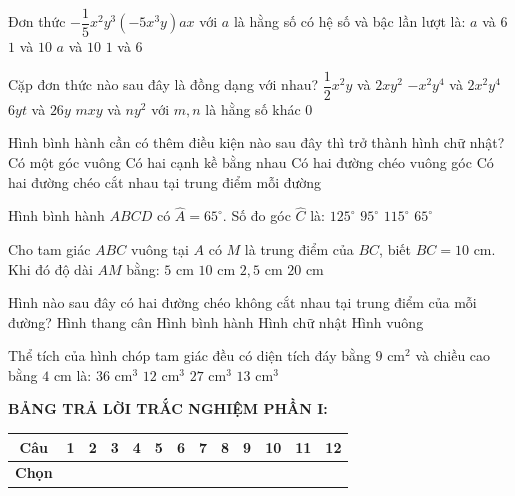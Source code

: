 \documentclass[12pt,a4paper]{article}
\begin{document}
\begin{ex}
Đơn thức $-\dfrac{1}{5}x^2y^3(-5x^3y)ax$ với $a$ là hằng số có hệ số và bậc lần lượt là:
\choice
{$a$ và $6$}
{$1$ và $10$}
{\True $a$ và $10$}
{$1$ và $6$}
\end{ex}

\begin{ex}
Cặp đơn thức nào sau đây là đồng dạng với nhau?
\choice
{$\dfrac{1}{2}x^2y$ và $2xy^2$}
{\True $-x^2y^4$ và $2x^2y^4$}
{$6yt$ và $26y$}
{$mxy$ và $ny^2$ với $m, n$ là hằng số khác $0$}
\end{ex}

\begin{ex}
Hình bình hành cần có thêm điều kiện nào sau đây thì trở thành hình chữ nhật?
\choice
{\True Có một góc vuông}
{Có hai cạnh kề bằng nhau}
{Có hai đường chéo vuông góc}
{Có hai đường chéo cắt nhau tại trung điểm mỗi đường}
\end{ex}

\begin{ex}
Hình bình hành $ABCD$ có $\widehat{A} = 65^\circ$. Số đo góc $\widehat{C}$ là:
\choice
{$125^\circ$}
{$95^\circ$}
{$115^\circ$}
{\True $65^\circ$}
\end{ex}

\begin{ex}
Cho tam giác $ABC$ vuông tại $A$ có $M$ là trung điểm của $BC$, biết $BC = 10\text{ cm}$. Khi đó độ dài $AM$ bằng:
\choice
{\True $5\text{ cm}$}
{$10\text{ cm}$}
{$2{,}5\text{ cm}$}
{$20\text{ cm}$}
\end{ex}

\begin{ex}
Hình nào sau đây có hai đường chéo không cắt nhau tại trung điểm của mỗi đường?
\choice
{\True Hình thang cân}
{Hình bình hành}
{Hình chữ nhật}
{Hình vuông}
\end{ex}

\begin{ex}
Thể tích của hình chóp tam giác đều có diện tích đáy bằng $9\text{ cm}^2$ và chiều cao bằng $4\text{ cm}$ là:
\choice
{$36\text{ cm}^3$}
{\True $12\text{ cm}^3$}
{$27\text{ cm}^3$}
{$13\text{ cm}^3$}
\end{ex}


\vspace{1mm}
\noindent\textbf{BẢNG TRẢ LỜI TRẮC NGHIỆM PHẦN I:}
\begin{center}
\begin{tabular}{|c|c|c|c|c|c|c|c|c|c|c|c|c|}
\hline
\textbf{Câu} & \textbf{1} & \textbf{2} & \textbf{3} & \textbf{4} & \textbf{5} & \textbf{6} & \textbf{7} & \textbf{8} & \textbf{9} & \textbf{10} & \textbf{11} & \textbf{12} \\
\hline
\textbf{Chọn} & \rule{0pt}{0.65cm} & & & & & & & & & & & \\
\hline
\end{tabular}
\end{center}
\vspace{2mm}
\end{document}
